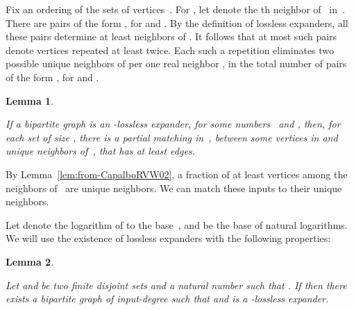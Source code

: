 \documentclass[11pt]{article}
\newcommand{\qed}{\hfill  \smallbreak}
\newenvironment{proof}{\noindent{\bf Proof:}}{\qed}
\newtheorem{lemma}{Lemma}
\begin{document}
\begin{proof}
Fix an ordering of the sets of vertices~.
For , let  denote the th neighbor of~ in~.
There are  pairs of the form , for  and .
By the definition of lossless expanders, all these pairs determine at least  neighbors of .
It follows that at most  such pairs denote vertices repeated at least twice. 
Each such a repetition  eliminates two possible unique neighbors of  per one real neighbor , in the total number  of pairs of the form , for  and .
\end{proof}



\begin{lemma}
\label{lem:partial-matching}

If a bipartite graph  is an -lossless expander, for some numbers~ and , then, for each set  of size , there is a partial matching in~, between some vertices in  and  unique neighbors of~, that has at least  edges.
\end{lemma}

\begin{proof}
By Lemma~\ref{lem:from-CapalboRVW02}, a fraction of at least  vertices among the neighbors of~ are unique neighbors.
We can match these inputs to their unique neighbors.
\end{proof}

Let  denote the logarithm of  to the base~, and  be the base of natural logarithms.
We will use the existence of lossless expanders with the following properties:



\begin{lemma}
\label{lem:expander}

Let   and  be two finite disjoint sets and  a natural number such that .
If  then there exists a bipartite graph  of input-degree  such that  and  is a -lossless expander.
\end{lemma}
\end{document}
